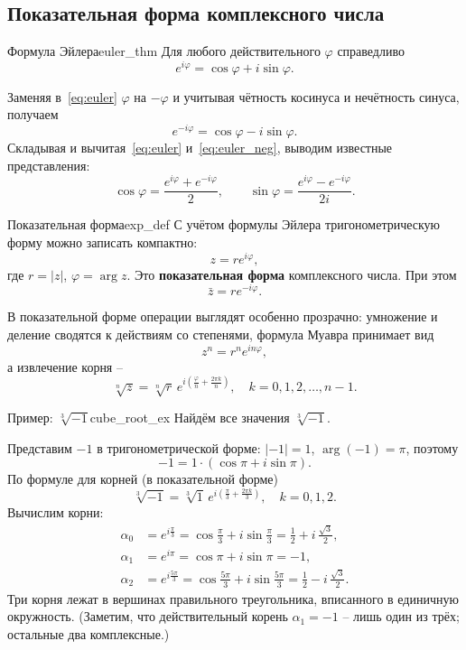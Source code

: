 \documentclass[12pt,a4paper]{article}
\begin{document}
\subsection*{Показательная форма комплексного числа}

\begin{theorem}{Формула Эйлера}{euler_thm}
Для любого действительного $\varphi$ справедливо
\begin{equation}
e^{i\varphi} = \cos\varphi + i\sin\varphi.
\tag{12.4}
\label{eq:euler}
\end{equation}
\end{theorem}

Заменяя в~\eqref{eq:euler} $\varphi$ на $-\varphi$ и учитывая чётность
косинуса и нечётность синуса, получаем
\begin{equation}
e^{-i\varphi} = \cos\varphi - i\sin\varphi.
\tag{12.5}
\label{eq:euler_neg}
\end{equation}
Складывая и вычитая~\eqref{eq:euler} и~\eqref{eq:euler_neg}, выводим
известные представления:
\[
\cos\varphi = \frac{e^{i\varphi} + e^{-i\varphi}}{2}, \qquad
\sin\varphi = \frac{e^{i\varphi} - e^{-i\varphi}}{2i}.
\]

\begin{definition}{Показательная форма}{exp_def}
С учётом формулы Эйлера тригонометрическую форму можно записать
компактно:
\[
z = re^{i\varphi},
\]
где $r = |z|$, $\varphi = \arg z$. Это \textbf{показательная форма}
комплексного числа. При этом
\[
\bar{z} = re^{-i\varphi}.
\]
\end{definition}

В показательной форме операции выглядят особенно прозрачно: умножение и
деление сводятся к действиям со степенями, формула Муавра принимает вид
\[
z^n = r^n e^{in\varphi},
\]
а извлечение корня --
\[
\sqrt[n]{z} = \sqrt[n]{r}\,
e^{i\left(\frac{\varphi}{n} + \frac{2\pi k}{n}\right)},
\quad k = 0, 1, 2, \dots, n-1.
\]

\begin{definition}{Пример: $\sqrt[3]{-1}$}{cube_root_ex}
Найдём все значения $\sqrt[3]{-1}$.

Представим $-1$ в тригонометрической форме: $|-1| = 1$,
$\arg(-1) = \pi$, поэтому
\[
-1 = 1\cdot(\cos\pi + i\sin\pi).
\]
По формуле для корней (в показательной форме)
\[
\sqrt[3]{-1} = \sqrt[3]{1}\,
e^{i\left(\frac{\pi}{3} + \frac{2\pi k}{3}\right)},
\quad k = 0, 1, 2.
\]
Вычислим корни:
\begin{align*}
\alpha_0 &= e^{i\frac{\pi}{3}}
= \cos\frac{\pi}{3} + i\sin\frac{\pi}{3}
= \frac{1}{2} + i\,\frac{\sqrt{3}}{2}, \\
\alpha_1 &= e^{i\pi} = \cos\pi + i\sin\pi = -1, \\
\alpha_2 &= e^{i\frac{5\pi}{3}}
= \cos\frac{5\pi}{3} + i\sin\frac{5\pi}{3}
= \frac{1}{2} - i\,\frac{\sqrt{3}}{2}.
\end{align*}
Три корня лежат в вершинах правильного треугольника, вписанного в
единичную окружность. (Заметим, что действительный корень
$\alpha_1 = -1$ -- лишь один из трёх; остальные два комплексные.)
\end{definition}
\end{document}
